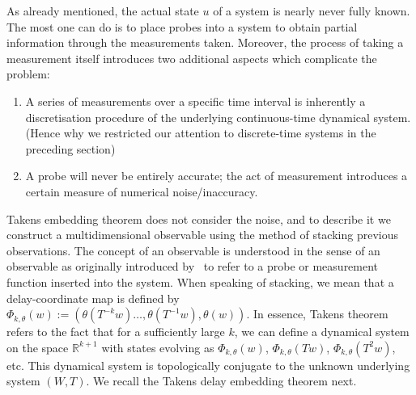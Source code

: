 
As already mentioned, the actual state $u$ of a system is nearly never fully known. The most one can do is to place probes into a system to obtain partial information through the measurements taken. Moreover, the process of taking a measurement itself introduces two additional aspects which complicate the problem:
\vspace{-6mm}
\begin{enumerate}[noitemsep, label=\roman*.]
  \item A series of measurements over a specific time interval is inherently a discretisation procedure of the underlying continuous-time dynamical system. (Hence why we restricted our attention to discrete-time systems in the preceding section)
  \item A probe will never be entirely accurate; the act of measurement introduces a certain measure of numerical noise/inaccuracy.
\end{enumerate}

Takens embedding theorem does not consider the noise, and to describe it we construct a multidimensional observable using the method of stacking previous observations.
The concept of an observable is understood in the sense of an observable as originally introduced by~\cite{takens1981detecting, genericObservableAeyels} to refer to a probe or measurement function inserted into the system. 
When speaking of stacking, we mean that a delay-coordinate map is defined by
$\Phi_{k,\theta}(w) := (\theta(T^{-k}w)\ldots,\theta(T^{-1}w),\theta(w))$.  
In essence, Takens theorem refers to the fact that for a sufficiently large $k$, we can define a dynamical system on the space $\mathbb{R}^{k+1}$ with states evolving as $\Phi_{k,\theta}(w)$, $\Phi_{k,\theta}(Tw)$, $\Phi_{k,\theta}(T^2w)$, etc. This dynamical system is topologically conjugate to the unknown underlying system $(W,T)$. We recall the Takens delay embedding theorem next.



